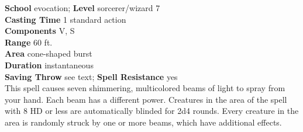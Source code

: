 \textbf{School} evocation; \textbf{Level} sorcerer/wizard 7\\
\textbf{Casting Time} 1 standard action\\
\textbf{Components} V, S\\
\textbf{Range} 60 ft.\\
\textbf{Area} cone-shaped burst\\
\textbf{Duration} instantaneous\\
\textbf{Saving Throw} see text; \textbf{Spell Resistance} yes\\
This spell causes seven shimmering, multicolored beams of light to spray from your hand. Each beam has a different power. Creatures in the area of the spell with 8 HD or less are automatically blinded for 2d4 rounds. Every creature in the area is randomly struck by one or more beams, which have additional effects.\\
